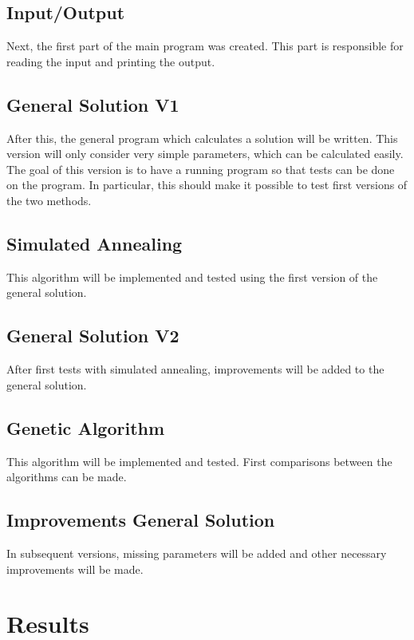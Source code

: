 \documentclass[10pt]{report}
\begin{document}
\section{Input/Output}
Next, the first part of the main program was created. This part is responsible for reading the input and printing the output.

\section{General Solution V1}
After this, the general program which calculates a solution will be written. This version will only consider very simple parameters, which can be calculated easily. The goal of this version is to have a running program so that tests can be done on the program. In particular, this should make it possible to test first versions of the two methods.

\section{Simulated Annealing}
This algorithm will be implemented and tested using the first version of the general solution.

\section{General Solution V2}
After first tests with simulated annealing, improvements will be added to the general solution.

\section{Genetic Algorithm}
This algorithm will be implemented and tested. First comparisons between the algorithms can be made.

\section{Improvements General Solution}
In subsequent versions, missing parameters will be added and other necessary improvements will be made.

\chapter{Results}
\end{document}
